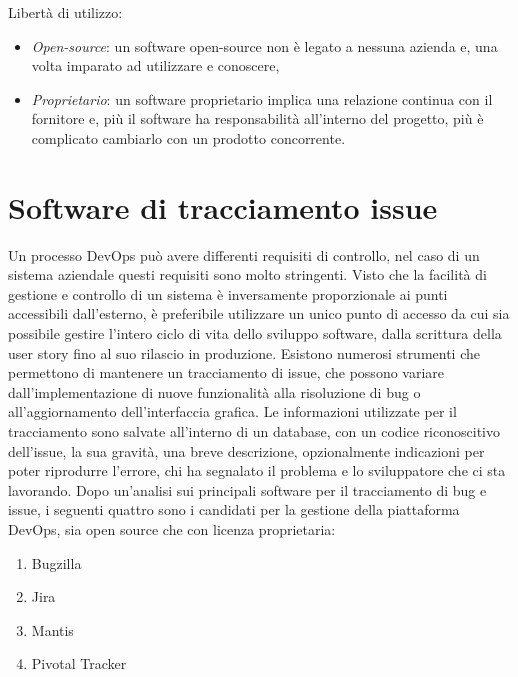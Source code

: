 \documentclass[a4paper, 12pt]{report}
\numberwithin{equation}{section}
\begin{document}
Libertà di utilizzo:
\begin{itemize}
    \item \emph{Open-source}: un software open-source non è legato a nessuna azienda e, una volta imparato ad utilizzare e conoscere,
    \item \emph{Proprietario}: un software proprietario implica una relazione continua con il fornitore e, più il software ha responsabilità all’interno del progetto, più è complicato cambiarlo con un prodotto concorrente.
\end{itemize}

\section{Software di tracciamento issue}
Un processo DevOps può avere differenti requisiti di controllo, nel caso di un sistema aziendale questi requisiti sono molto stringenti. Visto che la facilità di gestione e controllo di un sistema è inversamente proporzionale ai punti accessibili dall’esterno, è preferibile utilizzare un unico punto di accesso da cui sia possibile gestire l’intero ciclo di vita dello sviluppo software, dalla scrittura della user story fino al suo rilascio in produzione.
Esistono numerosi strumenti che permettono di mantenere un tracciamento di issue, che possono variare dall’implementazione di nuove funzionalità alla risoluzione di bug o all’aggiornamento dell’interfaccia grafica. Le informazioni utilizzate per il tracciamento sono salvate all’interno di un database, con un codice riconoscitivo dell’issue, la sua gravità, una breve descrizione, opzionalmente indicazioni per poter riprodurre l’errore, chi ha segnalato il problema e lo sviluppatore che ci sta lavorando.
Dopo un’analisi sui principali software per il tracciamento di bug e issue, i seguenti quattro sono i candidati per la gestione della piattaforma DevOps, sia open source che con licenza proprietaria:
\begin{enumerate}
    \item Bugzilla
    \item Jira
    \item Mantis
    \item Pivotal Tracker
\end{enumerate}
\end{document}
